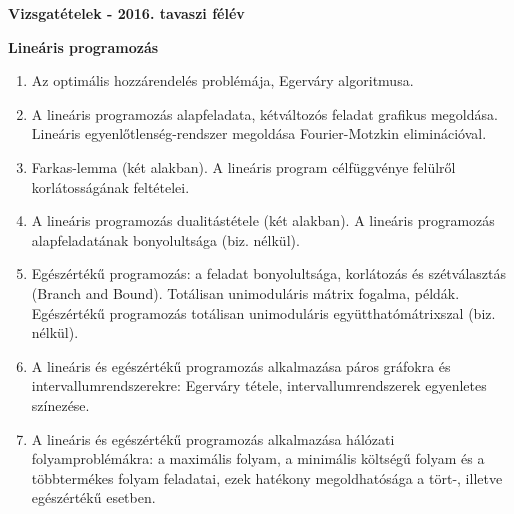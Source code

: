 
\footnotesize
\begin{center}
\large
\textbf{\Large Vizsgatételek - 2016. tavaszi félév}\\
\end{center}

\vspace{6mm}
\textbf{Lineáris programozás}
\begin{enumerate}
\item	Az optimális hozzárendelés problémája, Egerváry algoritmusa.
\item	A lineáris programozás alapfeladata, kétváltozós feladat grafikus megoldása. Lineáris egyenlőtlenség-rendszer megoldása Fourier-Motzkin eliminációval.
\item	Farkas-lemma (két alakban). A lineáris program célfüggvénye felülről korlátosságának feltételei.
\item	A lineáris programozás dualitástétele (két alakban). A lineáris programozás alapfeladatának bonyolultsága (biz. nélkül).
\item	Egészértékű programozás: a feladat bonyolultsága, korlátozás és szétválasztás (Branch and Bound). Totálisan unimoduláris mátrix fogalma, példák. Egészértékű programozás totálisan unimoduláris együtthatómátrixszal (biz. nélkül).
\item	A lineáris és egészértékű programozás alkalmazása páros gráfokra és intervallumrendszerekre: Egerváry tétele, intervallumrendszerek egyenletes színezése.
\item	A lineáris és egészértékű programozás alkalmazása hálózati folyamproblémákra: a maximális folyam, a minimális költségű folyam és a többtermékes folyam feladatai, ezek hatékony megoldhatósága a tört-, illetve egészértékű esetben.
\end{enumerate}


